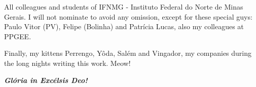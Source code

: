 \begin{agradecimentos}
All colleagues and students of IFNMG - Instituto Federal do Norte de Minas Gerais. I will not nominate to avoid any  omission, except for these special guys: Paulo Vitor (PV),  Felipe (Bolinha) and Patrícia Lucas, also my colleagues at PPGEE.

Finally, my kittens Perrengo, Yôda, Salém and Vingador, my companies during the long nights writing this work. Meow!

\vspace{5cm}


\begin{center}
\textbf{\textit{Glória in Excélsis Deo!}}
\end{center}

\end{agradecimentos}